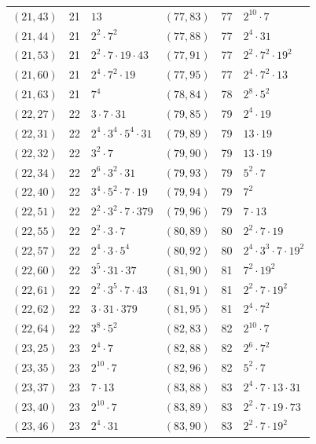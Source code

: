 \documentclass[11pt]{article}
\begin{document}
\begin{longtable}{@{}lrl@{\qquad}lrl@{}}
$(21,43)$ & 21 & $13$ & $(77,83)$ & 77 & $2^{10}\cdot 7$\\
$(21,44)$ & 21 & $2^{2}\cdot 7^{2}$ & $(77,88)$ & 77 & $2^{4}\cdot 31$\\
$(21,53)$ & 21 & $2^{2}\cdot 7\cdot 19\cdot 43$ & $(77,91)$ & 77 & $2^{2}\cdot 7^{2}\cdot 19^{2}$\\
$(21,60)$ & 21 & $2^{4}\cdot 7^{2}\cdot 19$ & $(77,95)$ & 77 & $2^{4}\cdot 7^{2}\cdot 13$\\
$(21,63)$ & 21 & $7^{4}$ & $(78,84)$ & 78 & $2^{8}\cdot 5^{2}$\\
$(22,27)$ & 22 & $3\cdot 7\cdot 31$ & $(79,85)$ & 79 & $2^{4}\cdot 19$\\
$(22,31)$ & 22 & $2^{4}\cdot 3^{4}\cdot 5^{4}\cdot 31$ & $(79,89)$ & 79 & $13\cdot 19$\\
$(22,32)$ & 22 & $3^{2}\cdot 7$ & $(79,90)$ & 79 & $13\cdot 19$\\
$(22,34)$ & 22 & $2^{6}\cdot 3^{2}\cdot 31$ & $(79,93)$ & 79 & $5^{2}\cdot 7$\\
$(22,40)$ & 22 & $3^{4}\cdot 5^{2}\cdot 7\cdot 19$ & $(79,94)$ & 79 & $7^{2}$\\
$(22,51)$ & 22 & $2^{2}\cdot 3^{2}\cdot 7\cdot 379$ & $(79,96)$ & 79 & $7\cdot 13$\\
$(22,55)$ & 22 & $2^{2}\cdot 3\cdot 7$ & $(80,89)$ & 80 & $2^{2}\cdot 7\cdot 19$\\
$(22,57)$ & 22 & $2^{4}\cdot 3\cdot 5^{4}$ & $(80,92)$ & 80 & $2^{4}\cdot 3^{3}\cdot 7\cdot 19^{2}$\\
$(22,60)$ & 22 & $3^{5}\cdot 31\cdot 37$ & $(81,90)$ & 81 & $7^{2}\cdot 19^{2}$\\
$(22,61)$ & 22 & $2^{2}\cdot 3^{5}\cdot 7\cdot 43$ & $(81,91)$ & 81 & $2^{2}\cdot 7\cdot 19^{2}$\\
$(22,62)$ & 22 & $3\cdot 31\cdot 379$ & $(81,95)$ & 81 & $2^{4}\cdot 7^{2}$\\
$(22,64)$ & 22 & $3^{8}\cdot 5^{2}$ & $(82,83)$ & 82 & $2^{10}\cdot 7$\\
$(23,25)$ & 23 & $2^{4}\cdot 7$ & $(82,88)$ & 82 & $2^{6}\cdot 7^{2}$\\
$(23,35)$ & 23 & $2^{10}\cdot 7$ & $(82,96)$ & 82 & $5^{2}\cdot 7$\\
$(23,37)$ & 23 & $7\cdot 13$ & $(83,88)$ & 83 & $2^{4}\cdot 7\cdot 13\cdot 31$\\
$(23,40)$ & 23 & $2^{10}\cdot 7$ & $(83,89)$ & 83 & $2^{2}\cdot 7\cdot 19\cdot 73$\\
$(23,46)$ & 23 & $2^{4}\cdot 31$ & $(83,90)$ & 83 & $2^{2}\cdot 7\cdot 19^{2}$\\

\end{longtable}
\end{document}
